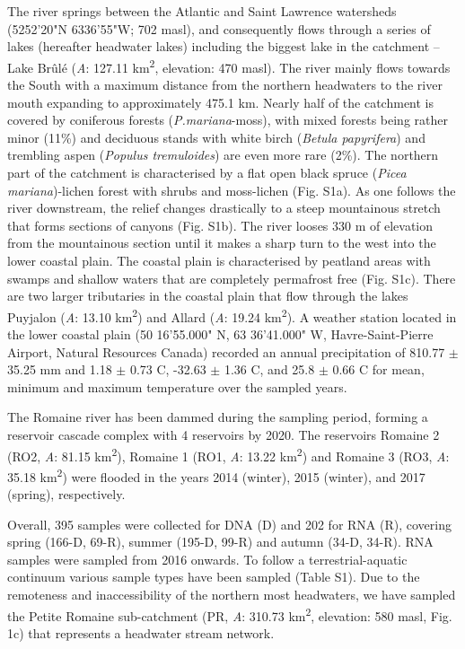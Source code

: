 \documentclass[12pt,a4paper]{article} %
\begin{document}
The river springs between the Atlantic and Saint Lawrence watersheds (52\textdegree{}52'20"N 63\textdegree{}36'55"W; 702 masl), and consequently flows through a series of lakes (hereafter headwater lakes) including the biggest lake in the catchment – Lake Br\^{u}l\'{e} (\textit{A}: 127.11 km\textsuperscript{2}, elevation: 470 masl). The river mainly flows towards the South with a maximum distance from the northern headwaters to the river mouth expanding to approximately 475.1 km. Nearly half of the catchment is covered by coniferous forests (\textit{P.mariana}-moss), with mixed forests being rather minor (11\%) and deciduous stands with white birch (\textit{Betula papyrifera}) and trembling aspen (\textit{Populus tremuloides}) are even more rare (2\%)\citep{HQreport2009}. The northern part of the catchment is characterised by a flat open black spruce (\textit{Picea mariana})-lichen forest with shrubs and moss-lichen (Fig. S1a). As one follows the river downstream, the relief changes drastically to a steep mountainous stretch that forms sections of canyons (Fig. S1b). The river looses 330 m of elevation from the mountainous section until it makes a sharp turn to the west into the lower coastal plain. The coastal plain is characterised by peatland areas with swamps and shallow waters that are completely permafrost free (Fig. S1c). There are two larger tributaries in the coastal plain that flow through the lakes Puyjalon (\textit{A}: 13.10 km\textsuperscript{2}) and Allard (\textit{A}: 19.24 km\textsuperscript{2}). A weather station located in the lower coastal plain (50\textdegree{} 16'55.000" N, 63\textdegree{} 36'41.000" W, Havre-Saint-Pierre Airport, Natural Resources Canada) recorded an annual precipitation of 810.77 $\pm$ 35.25 mm and 1.18 $\pm$ 0.73 \textdegree{}C, -32.63 $\pm$ 1.36 \textdegree{}C, and 25.8 $\pm$ 0.66 \textdegree{}C for mean, minimum and maximum temperature over the sampled years. 

The Romaine river has been dammed during the sampling period, forming a reservoir cascade complex with 4 reservoirs by 2020. The reservoirs Romaine 2 (RO2, \textit{A}: 81.15 km\textsuperscript{2}), Romaine 1 (RO1, \textit{A}: 13.22 km\textsuperscript{2}) and Romaine 3 (RO3, \textit{A}: 35.18 km\textsuperscript{2}) were flooded in the years 2014 (winter), 2015 (winter), and 2017 (spring), respectively.

Overall, 395 samples were collected for DNA (D) and 202 for RNA (R), covering spring (166-D, 69-R), summer (195-D, 99-R) and autumn (34-D, 34-R). RNA samples were sampled from 2016 onwards. To follow a terrestrial-aquatic continuum various sample types have been sampled (Table S1). Due to the remoteness and inaccessibility of the northern most headwaters, we have sampled the Petite Romaine sub-catchment (PR, \textit{A}: 310.73 km\textsuperscript{2}, elevation: 580 masl, Fig. 1c) that represents a headwater stream network. 
\end{document}
